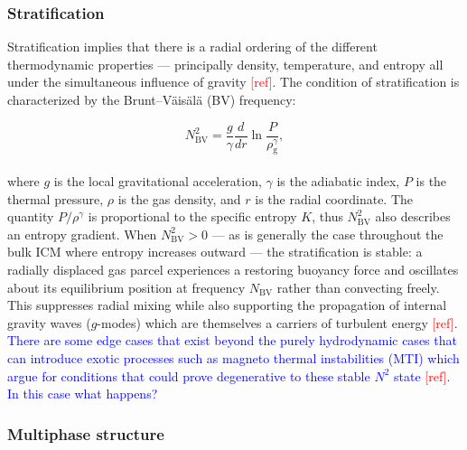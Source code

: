 \subsubsection{Stratification}

Stratification implies that there is a radial ordering of the different thermodynamic properties — principally density, temperature, and entropy all under the simultaneous influence of gravity \textcolor{red}{[ref]}. The condition of stratification is characterized by the Brunt--V\"{a}is\"{a}l\"{a} (BV) frequency:

\begin{equation}
	N_\mathrm{BV}^2 = \frac{g}{\gamma}\frac{d}{dr}\ln{\frac{P}{\rho_{\mathrm{g}}^{\gamma}}},
	\label{eq:BrutVaisalaFreq}
\end{equation}
\\
where $g$ is the local gravitational acceleration, $\gamma$ is the adiabatic index, $P$ is the thermal pressure, $\rho$ is the gas density, and $r$ is the radial coordinate. The quantity $P/\rho^\gamma$ is proportional to the specific entropy $K$, thus $N_\mathrm{BV}^2$ also describes an entropy gradient. When $N_\mathrm{BV}^2 > 0$ — as is generally the case throughout the bulk ICM where entropy increases outward — the stratification is stable: a radially displaced gas parcel experiences a restoring buoyancy force and oscillates about its equilibrium position at frequency $N_\mathrm{BV}$ rather than convecting freely. This suppresses radial mixing while also supporting the propagation of internal gravity waves ($g$-modes) which are themselves a carriers of turbulent energy \textcolor{red}{[ref]}. \textcolor{blue}{There are some edge cases that exist beyond the purely hydrodynamic cases that can introduce exotic processes such as magneto thermal instabilities (MTI) which argue for conditions that could prove degenerative to these stable $N^2$ state \textcolor{red}{[ref]}. In this case what happens?}

\subsubsection{Multiphase structure}

